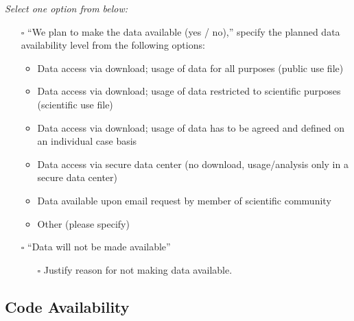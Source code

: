 \documentclass[
]{article}
\providecommand{\tightlist}{%
  \setlength{\itemsep}{0pt}\setlength{\parskip}{0pt}}\usepackage{longtable,booktabs,array}
\begin{document}
\begin{tcolorbox}[enhanced jigsaw, toprule=.15mm, titlerule=0mm, coltitle=black, title=\textcolor{quarto-callout-caution-color}{\faFire}\hspace{0.5em}{Preregistration Item}, bottomtitle=1mm, arc=.35mm, breakable, toptitle=1mm, bottomrule=.15mm, left=2mm, colframe=quarto-callout-caution-color-frame, colback=white, rightrule=.15mm, leftrule=.75mm, colbacktitle=quarto-callout-caution-color!10!white, opacityback=0, opacitybacktitle=0.6]

\emph{Select one option from below:}

\begin{itemize}
\tightlist
\item[$\square$]
  ``We plan to make the data available (yes / no),'' specify the planned
  data availability level from the following options:

  \begin{itemize}
  \tightlist
  \item
    Data access via download; usage of data for all purposes (public use
    file)
  \item
    Data access via download; usage of data restricted to scientific
    purposes (scientific use file)
  \item
    Data access via download; usage of data has to be agreed and defined
    on an individual case basis
  \item
    Data access via secure data center (no download, usage/analysis only
    in a secure data center)
  \item
    Data available upon email request by member of scientific community
  \item
    Other (please specify)
  \end{itemize}
\item[$\square$]
  ``Data will not be made available''

  \begin{itemize}
  \tightlist
  \item[$\square$]
    Justify reason for not making data available.
  \end{itemize}
\end{itemize}

\end{tcolorbox}

\subsection*{Code Availability}\label{code-availability}
\end{document}
